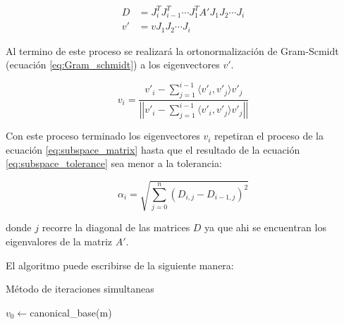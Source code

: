\begin{align*}
    D  & = J_i^TJ_{i-1}^T\cdots J_1^TA' J_1J_2\cdots J_i \\
    v' & = vJ_1J_2\cdots J_i
\end{align*}

Al termino de este proceso se realizará la ortonormalización de Gram-Scmidt (ecuación \ref{eq:Gram_schmidt}) a los eigenvectores $v'$.

\begin{equation}
    v_i = \frac{v'_i - \sum\limits_{j=1}^{i-1} \langle v'_i ,v'_j \rangle v'_j}{\left |\left |v'_i - \sum\limits_{j=1}^{i-1} \langle v'_i ,v'_j \rangle v'_j \right |\right |} \label{eq:Gram_schmidt}
\end{equation}

Con este proceso terminado los eigenvectores $v_i$ repetiran el proceso de la ecuación \ref{eq:subspace_matrix} hasta que el resultado de la ecuación \ref{eq:subspace_tolerance} sea menor a la tolerancia:

\begin{equation}
    \alpha_i = \sqrt{\sum_{j=0}^{n} (D_{i,j}-D_{i-1,j})^2} \label{eq:subspace_tolerance}
\end{equation}

donde $j$ recorre la diagonal de las matrices $D$ ya que ahi se encuentran los eigenvalores de la matriz $A'$.

El algoritmo puede escribirse de la siguiente manera:

\begin{algorithm}[H]
    \caption{Método de iteraciones simultaneas}
    \label{alg:simultaneous_iterations}
    $v_0 \gets $canonical\_base(m)\\
\end{algorithm}